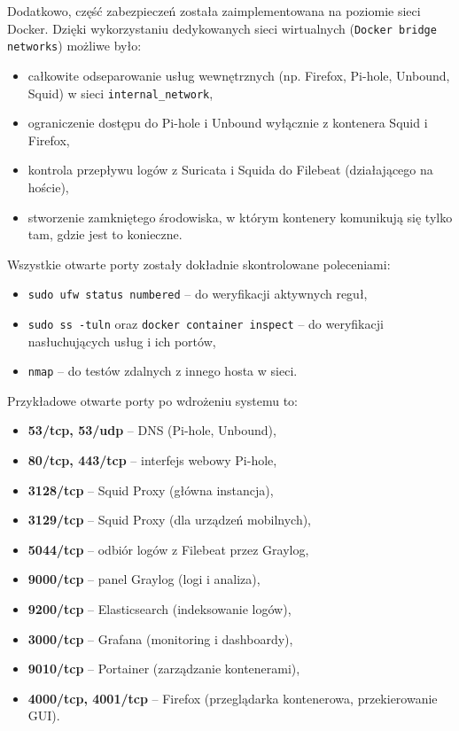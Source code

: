 \documentclass[
    left=2.5cm,         %
    right=2.5cm,        %
    top=2.5cm,          %
    bottom=3cm,         %
    bindingoffset=6mm,  %
    nohyphenation=true %
]{eiti/eiti-thesis} %
\begin{document}
Dodatkowo, część zabezpieczeń została zaimplementowana na poziomie sieci Docker. Dzięki wykorzystaniu dedykowanych sieci wirtualnych (\texttt{Docker bridge networks}) możliwe było:
\begin{itemize}
    \item całkowite odseparowanie usług wewnętrznych (np. Firefox, Pi-hole, Unbound, Squid) w sieci \texttt{internal\_network},
    \item ograniczenie dostępu do Pi-hole i Unbound wyłącznie z kontenera Squid i Firefox,
    \item kontrola przepływu logów z Suricata i Squida do Filebeat (działającego na hoście),
    \item stworzenie zamkniętego środowiska, w którym kontenery komunikują się tylko tam, gdzie jest to konieczne.
\end{itemize}

Wszystkie otwarte porty zostały dokładnie skontrolowane poleceniami:
\begin{itemize}
    \item \texttt{sudo ufw status numbered} – do weryfikacji aktywnych reguł,
    \item \texttt{sudo ss -tuln} oraz \texttt{docker container inspect} – do weryfikacji nasłuchujących usług i ich portów,
    \item \texttt{nmap} – do testów zdalnych z innego hosta w sieci.
\end{itemize}

Przykładowe otwarte porty po wdrożeniu systemu to:
\begin{itemize}
    \item \textbf{53/tcp, 53/udp} – DNS (Pi-hole, Unbound),
    \item \textbf{80/tcp, 443/tcp} – interfejs webowy Pi-hole,
    \item \textbf{3128/tcp} – Squid Proxy (główna instancja),
    \item \textbf{3129/tcp} – Squid Proxy (dla urządzeń mobilnych),
    \item \textbf{5044/tcp} – odbiór logów z Filebeat przez Graylog,
    \item \textbf{9000/tcp} – panel Graylog (logi i analiza),
    \item \textbf{9200/tcp} – Elasticsearch (indeksowanie logów),
    \item \textbf{3000/tcp} – Grafana (monitoring i dashboardy),
    \item \textbf{9010/tcp} – Portainer (zarządzanie kontenerami),
    \item \textbf{4000/tcp, 4001/tcp} – Firefox (przeglądarka kontenerowa, przekierowanie GUI).
\end{itemize}
\end{document}
